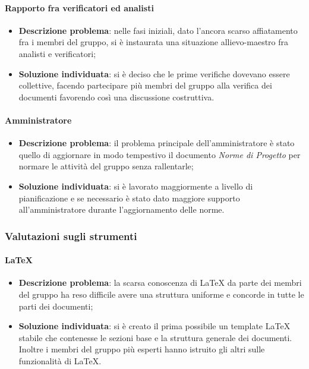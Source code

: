 		\paragraph{Rapporto fra verificatori ed analisti}
			\begin{itemize}
				\item \textbf{Descrizione problema}: nelle fasi iniziali, dato l'ancora scarso affiatamento fra i membri del gruppo, si è instaurata una situazione allievo-maestro fra analisti e verificatori;
				\item \textbf{Soluzione individuata}: si è deciso che le prime verifiche dovevano essere collettive, facendo partecipare più membri del gruppo alla verifica dei documenti favorendo così una discussione costruttiva.
			\end{itemize}
		\paragraph{Amministratore}
			\begin{itemize}
				\item \textbf{Descrizione problema}: il problema principale dell'amministratore è stato quello di aggiornare in modo tempestivo il documento \textit{Norme di Progetto} per normare le attività del gruppo senza rallentarle;
				\item \textbf{Soluzione individuata}: si è lavorato maggiormente a livello di pianificazione e se necessario è stato dato maggiore supporto all'amministratore durante l'aggiornamento delle norme.
			\end{itemize}
	\subsubsection{Valutazioni sugli strumenti}
		\paragraph{\LaTeX}
			\begin{itemize}
				\item \textbf{Descrizione problema}: la scarsa conoscenza di \LaTeX\xspace da parte dei membri del gruppo ha reso difficile avere una struttura uniforme e concorde in tutte le parti dei documenti;
				\item \textbf{Soluzione individuata}: si è creato il prima possibile un template \LaTeX\xspace stabile che contenesse le sezioni base e la struttura generale dei documenti. Inoltre i membri del gruppo più esperti hanno istruito gli altri sulle funzionalità di \LaTeX.
			\end{itemize}
